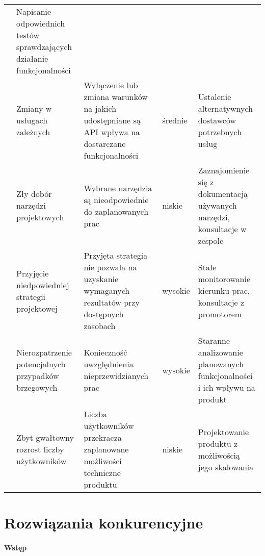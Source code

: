 \begin{longtable}{|p{.1\linewidth}|p{}|p{}|p{}|p{}|}
    & Napisanie odpowiednich testów sprawdzających działanie funkcjonalności \\
    \cline{2-5}
    & Zmiany w usługach zależnych & Wyłączenie lub zmiana warunków na jakich udostępniane są API wpływa na dostarczane funkcjonalności & średnie
    & Ustalenie alternatywnych dostawców potrzebnych usług \\
    \cline{2-5}
    & Zły dobór narzędzi projektowych & Wybrane narzędzia są nieodpowiednie do zaplanowanych prac & niskie
    & Zaznajomienie się z dokumentacją używanych narzędzi, konsultacje w zespole \\
    \hline
    \multirow{2}{=}{\parbox[c]{3.5cm}{}} & Przyjęcie niedpowiedniej strategii projektowej & Przyjęta strategia nie pozwala na uzyskanie wymaganych rezultatów przy dostępnych zasobach & wysokie
    & Stałe monitorowanie kierunku prac, konsultacje z promotorem \\
    \cline{2-5}
    & Nierozpatrzenie potencjalnych przypadków brzegowych & Konieczność uwzględnienia nieprzewidzianych prac & wysokie
    & Staranne analizowanie planowanych funkcjonalności i ich wpływu na produkt \\
    \hline
    \multirow{1}{=}{\parbox[c]{2cm}{}}& Zbyt gwałtowny rozrost liczby użytkowników & Liczba użytkowników przekracza zaplanowane możliwości techniczne produktu & niskie
    & Projektowanie produktu z możliwością jego skalowania \\
    \hline

\end{longtable}
\section{Rozwiązania konkurencyjne}
\label{sec:rozwiazania-konkurencyjne}

\paragraph{Wstęp}

